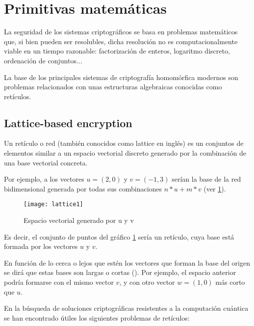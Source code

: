 \section{Primitivas matemáticas}

La seguridad de los sistemas criptográficos se basa en problemas matemáticos que, si bien pueden ser resolubles, dicha resolución no es computacionalmente viable en un tiempo razonable: factorización de enteros, logaritmo discreto, ordenación de conjuntos...

La base de los principales sistemas de criptografía homomórfica modernos son problemas relacionados con unas estructuras algebraicas conocidas como retículos.

\subsection{Lattice-based encryption}

Un retículo o red (también conocidos como lattice en inglés) es un conjuntos de elementos similar a un espacio vectorial discreto generado por la combinación de una base vectorial concreta.

Por ejemplo, a los vectores $u = (2, 0)$ y $v = (-1, 3)$ serían la base de la red bidimensional generada por todas sus combinaciones $n*u + m*v$ (ver \ref{fig:lattice1}).

\begin{figure}[h]
  \texttt{[image: lattice1]}
  \caption{Espacio vectorial generado por u y v}
  \label{fig:lattice1}
\end{figure}

Es decir, el conjunto de puntos del gráfico \ref{fig:lattice1} sería un retículo, cuya base está formada por los vectores $u$ y $v$.

En función de lo cerca o lejos que estén los vectores que forman la base del origen se dirá que estas bases son largas o cortas (\cite{wickr_what_2018}). Por ejemplo, el espacio anterior podría formarse con el mismo vector $v$, y con otro vector $w = (1, 0)$ más corto que $u$.

En la búsqueda de soluciones criptográficas resistentes a la computación cuántica se han encontrado útiles los siguientes problemas de retículos:

